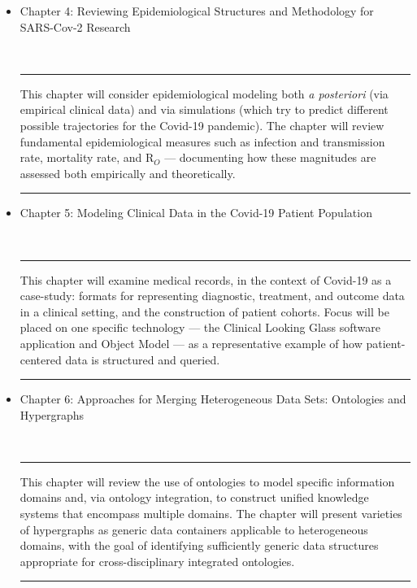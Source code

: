 \documentclass{statsoc}
\newenvironment{summary}{\\\vspace{-4pt}%
%
%
\noindent\hfil\textcolor{rgrey!50!purple}{\rule{0.5\textwidth}{.4pt}}\hfil

\hspace{-2cm}\begin{minipage}{1.02\textwidth}\fontfamily{phv}\fontsize{9}{11}\selectfont}%
{\\\vspace{-1em}\end{minipage}
{\begin{center}\textcolor{rgrey!50!yellow}{\rule{0.5\textwidth}{.4pt}}\end{center}}
\vspace{2em}}%
\begin{document}
{\begin{description}
\begin{itemize}
\item Chapter 4: Reviewing Epidemiological Structures and Methodology for SARS-Cov-2 Research

\begin{summary}
This chapter will consider epidemiological modeling both \textit{a posteriori}
(via empirical clinical data) and via simulations (which try to 
predict different possible trajectories for the Covid-19 pandemic).  
The chapter will review fundamental epidemiological measures such 
as infection and transmission rate, mortality rate, and R$_O$ --- 
documenting how these magnitudes are assessed both empirically and theoretically. 
\end{summary}

\item Chapter 5: Modeling Clinical Data in the Covid-19 Patient Population  

\begin{summary}
This chapter will examine medical records, in the context of 
Covid-19 as a case-study: formats for representing 
diagnostic, treatment, and outcome data in a clinical setting, 
and the construction of patient cohorts.  Focus will be 
placed on one specific technology --- the 
Clinical Looking Glass software application and Object Model --- 
as a representative example of how patient-centered 
data is structured and queried.
\end{summary}

\end{itemize}

\vspace{2em}

\item[Part II: Creating a Cross-Disciplinary Ecosystem for Covid-19]

\begin{itemize}

\item Chapter 6: Approaches for Merging Heterogeneous Data Sets: Ontologies and Hypergraphs

\begin{summary}
This chapter will review the use of ontologies to model 
specific information domains and, via ontology integration, 
to construct unified knowledge systems that encompass 
multiple domains.  The chapter will present varieties 
of hypergraphs as generic data containers applicable 
to heterogeneous domains, with the goal of identifying 
sufficiently generic data structures appropriate 
for cross-disciplinary integrated ontologies.   
\end{summary}


\end{itemize}
\end{description}}
\end{document}
